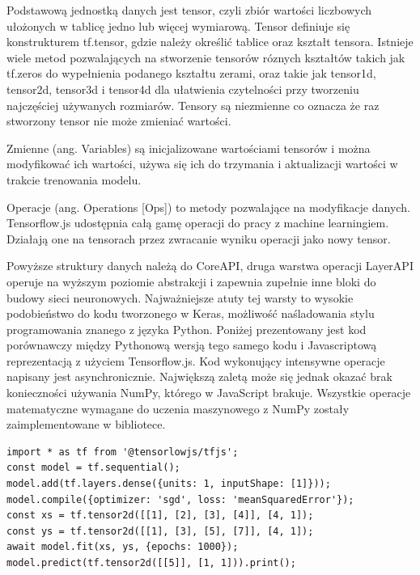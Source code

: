 \documentclass[12pt,a4paper,twoside,titlepage,openright]{book}
\begin{document}
Podstawową jednostką danych jest tensor, czyli zbiór wartości liczbowych ułożonych w tablicę jedno lub więcej wymiarową. Tensor definiuje się konstrukturem tf.tensor, gdzie należy określić tablice oraz kształt tensora. Istnieje wiele metod pozwalających na stworzenie tensorów róznych kształtów takich jak tf.zeros do wypełnienia podanego kształtu zerami, oraz takie jak tensor1d, tensor2d, tensor3d i tensor4d dla ułatwienia czytelności przy tworzeniu najczęściej używanych rozmiarów.
Tensory są niezmienne co oznacza że raz stworzony tensor nie może zmieniać wartości. 

Zmienne (ang. Variables) są inicjalizowane wartościami tensorów i można modyfikować ich wartości, używa się ich do trzymania i aktualizacji wartości w trakcie trenowania modelu.

Operacje (ang. Operations [Ops]) to metody pozwalające na modyfikacje danych. Tensorflow.js udostępnia całą gamę operacji do pracy z machine learningiem. Działają one na tensorach przez zwracanie wyniku operacji jako nowy tensor.

Powyższe struktury danych należą do CoreAPI, druga warstwa operacji LayerAPI operuje na wyższym poziomie abstrakcji i zapewnia zupełnie inne bloki do budowy sieci neuronowych. Najważniejsze atuty tej warsty to wysokie podobieństwo do kodu tworzonego w Keras, możliwość naśladowania stylu programowania znanego z języka Python. Poniżej prezentowany jest kod porównawczy między Pythonową wersją tego samego kodu i Javascriptową reprezentacją z użyciem Tensorflow.js. Kod wykonujący intensywne operacje napisany jest asynchronicznie. Największą zaletą może się jednak okazać brak konieczności używania NumPy, którego w JavaScript brakuje. Wszystkie operacje matematyczne wymagane do uczenia maszynowego z NumPy zostały zaimplementowane w bibliotece.

\noindent
\begin{minipage}{\linewidth}
\begin{lstlisting}[caption=Proste operacje w JavaScript z Tensorflow.js, label=lst:test]
import * as tf from '@tensorlowjs/tfjs';
const model = tf.sequential();
model.add(tf.layers.dense({units: 1, inputShape: [1]}));
model.compile({optimizer: 'sgd', loss: 'meanSquaredError'});
const xs = tf.tensor2d([[1], [2], [3], [4]], [4, 1]);
const ys = tf.tensor2d([[1], [3], [5], [7]], [4, 1]);
await model.fit(xs, ys, {epochs: 1000});
model.predict(tf.tensor2d([[5]], [1, 1])).print();
\end{lstlisting}
\end{minipage}
\end{document}
